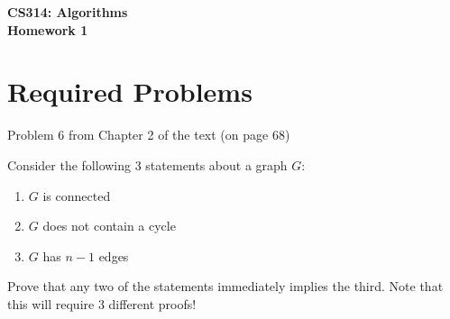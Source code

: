 \documentclass[11pt]{article}
\begin{document}


\begin{center}
{\LARGE\bf      CS314: Algorithms}
\\[1ex]
{\Large\bf      Homework 1}
\\[0.25in]
\end{center}


\section*{Required Problems}

\begin{problems}
    \item Problem 6 from Chapter 2 of the text (on page 68)
    
    \item Consider the following 3 statements about a graph $G$:
    
    \begin{enumerate}
    \item $G$ is connected
    
    \item $G$ does not contain a cycle
    
    \item $G$ has $n-1$ edges
    
    \end{enumerate}
    
    Prove that any two of the statements immediately implies the third.  Note that this will require 3 different proofs!
    
    \end{problems}
\end{document}
